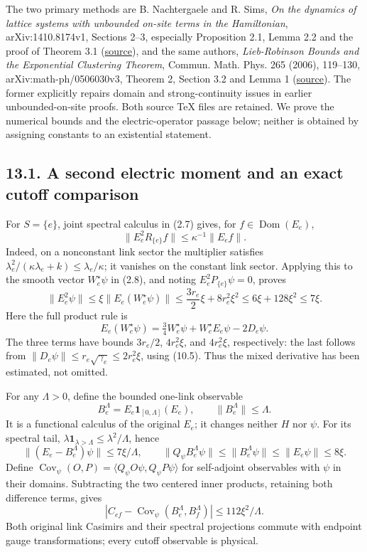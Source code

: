 \documentclass[
]{article}
\begin{document}
The two primary methods are B. Nachtergaele and R. Sims, \emph{On the
dynamics of lattice systems with unbounded on-site terms in the
Hamiltonian}, arXiv:1410.8174v1, Sections 2--3, especially Proposition
2.1, Lemma 2.2 and the proof of Theorem 3.1
(\href{https://arxiv.org/abs/1410.8174v1}{source}), and the same
authors, \emph{Lieb-Robinson Bounds and the Exponential Clustering
Theorem}, Commun. Math. Phys. 265 (2006), 119--130,
arXiv:math-ph/0506030v3, Theorem 2, Section 3.2 and Lemma 1
(\href{https://arxiv.org/abs/math-ph/0506030v3}{source}). The former
explicitly repairs domain and strong-continuity issues in earlier
unbounded-on-site proofs. Both source TeX files are retained. We prove
the numerical bounds and the electric-operator passage below; neither is
obtained by assigning constants to an existential statement.

\subsection{13.1. A second electric moment and an exact cutoff
comparison}\label{a-second-electric-moment-and-an-exact-cutoff-comparison}

For \(S=\{e\}\), joint spectral calculus in (2.7) gives, for
\(f\in\operatorname{Dom}(E_e)\), \[
\|E_e^2R_{\{e\}}f\|\le\kappa^{-1}\|E_ef\|.
\] Indeed, on a nonconstant link sector the multiplier satisfies
\(\lambda_e^2/(\kappa\lambda_e+k)\le\lambda_e/\kappa\); it vanishes on
the constant link sector. Applying this to the smooth vector
\(W_e^\star\psi\) in (2.8), and noting \(E_e^2P_{\{e\}}\psi=0\), proves
\[
\|E_e^2\psi\|\le\xi\|E_e(W_e^\star\psi)\|
\le\frac{3r_e}{2}\xi+8r_e^2\xi^2
\le6\xi+128\xi^2\le7\xi.                                   \tag{13.2}
\] Here the full product rule is \[
E_e(W_e^\star\psi)=\tfrac34W_e^\star\psi+
 W_e^\star E_e\psi-2D_e\psi.
\] The three terms have bounds \(3r_e/2\), \(4r_e^2\xi\), and
\(4r_e^2\xi\), respectively: the last follows from
\(\|D_e\psi\|\le r_e\sqrt{\gamma_e}\le2r_e^2\xi\), using (10.5). Thus
the mixed derivative has been estimated, not omitted.

For any \(\Lambda>0\), define the bounded one-link observable \[
B_e^\Lambda=E_e\mathbf1_{[0,\Lambda]}(E_e),\qquad
\|B_e^\Lambda\|\le\Lambda.
\] It is a functional calculus of the original \(E_e\); it changes
neither \(H\) nor \(\psi\). For its spectral tail,
\(\lambda\mathbf1_{\lambda>\Lambda}\le\lambda^2/\Lambda\), hence \[
\|(E_e-B_e^\Lambda)\psi\|\le7\xi/\Lambda,\qquad
\|Q_\psi B_e^\Lambda\psi\|\le\|B_e^\Lambda\psi\|
 \le\|E_e\psi\|\le8\xi.                                     \tag{13.3}
\] Define \(\operatorname{Cov}_\psi(O,P)=
\langle Q_\psi O\psi,Q_\psi P\psi\rangle\) for self-adjoint observables
with \(\psi\) in their domains. Subtracting the two centered inner
products, retaining both difference terms, gives \[
|C_{ef}-\operatorname{Cov}_\psi(B_e^\Lambda,B_f^\Lambda)|
\le112\xi^2/\Lambda.                                        \tag{13.4}
\] Both original link Casimirs and their spectral projections commute
with endpoint gauge transformations; every cutoff observable is
physical.
\end{document}

